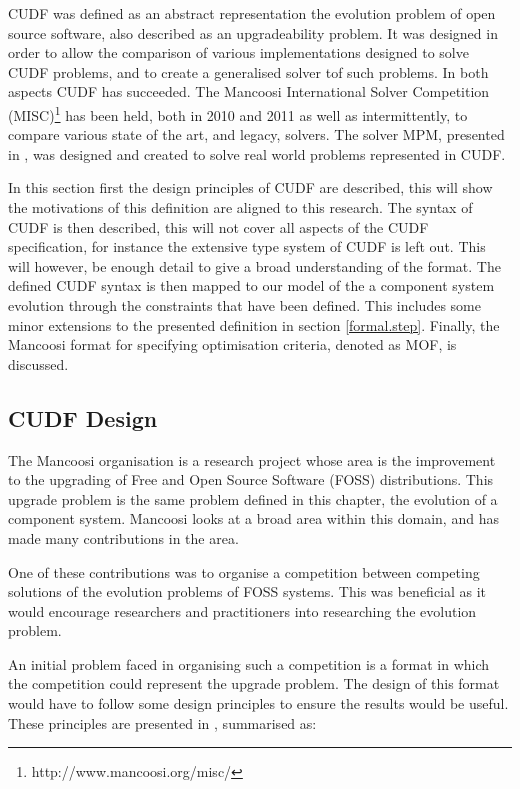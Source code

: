 CUDF was defined as an abstract representation the evolution problem of open source software, also described as an upgradeability problem.
It was designed in order to allow the comparison of various implementations designed to solve CUDF problems, 
and to create a generalised solver tof such problems.
In both aspects CUDF has succeeded.
The Mancoosi International Solver Competition (MISC)\footnote{http://www.mancoosi.org/misc/} has been held, both in 2010 and 2011 as well as intermittently, 
to compare various state of the art, and legacy, solvers.
The solver MPM, presented in \cite{abate2011}, was designed and created to solve real world problems represented in CUDF.

In this section first the design principles of CUDF are described, this will show the motivations of this definition are aligned to this research.
The syntax of CUDF is then described, this will not cover all aspects of the CUDF specification, for instance the extensive type system of CUDF is left out.
This will however, be enough detail to give a broad understanding of the format.
The defined CUDF syntax is then mapped to our model of the a component system evolution through the constraints that have been defined.
This includes some minor extensions to the presented definition in section \ref{formal.step}.
Finally, the Mancoosi format for specifying optimisation criteria, denoted as MOF, is discussed.

\subsection{CUDF Design}
The Mancoosi organisation is a research project whose area is the improvement to the upgrading of Free and Open Source Software (FOSS) distributions.
This upgrade problem is the same problem defined in this chapter, the evolution of a component system.
Mancoosi looks at a broad area within this domain, and has made many contributions in the area.

One of these contributions was to organise a competition between competing solutions of the evolution problems of FOSS systems.
This was beneficial as it would encourage researchers and practitioners into researching the evolution problem.

An initial problem faced in organising such a competition is a format in which the competition could represent the upgrade problem.
The design of this format would have to follow some design principles to ensure the results would be useful.
These principles are presented in \cite{treinen2009common}, summarised as:

